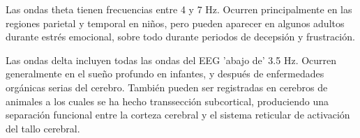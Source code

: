 
Las ondas theta tienen frecuencias entre 4 y 7 Hz. Ocurren principalmente en las regiones
parietal y temporal en ni\~nos, pero pueden aparecer en algunos adultos durante 
estr\'es emocional, sobre todo durante periodos de decepsi\'on y frustraci\'on.


Las ondas delta incluyen todas las ondas del EEG 'abajo de' 3.5 Hz. 
Ocurren generalmente en el sue\~no profundo en infantes,
y despu\'es de enfermedades org\'anicas serias del cerebro.
Tambi\'en pueden ser registradas en cerebros de animales a los cuales se ha hecho 
transsecci\'on subcortical, produciendo una separaci\'on funcional entre la corteza
cerebral y el 
sistema reticular de activaci\'on del tallo cerebral. 


